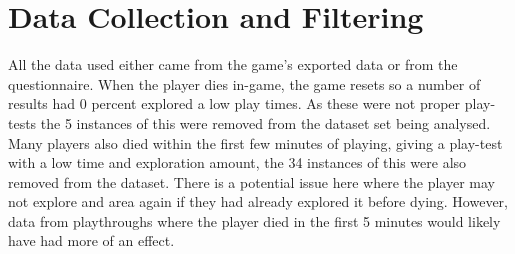 \documentclass[journal]{IEEEtran}
\begin{document}
	\section{Data Collection and Filtering}  \label{datacollection}
	All the data used either came from the game's exported data or from the questionnaire. When the player dies in-game, the game resets so a number of results had 0 percent explored a low play times. As these were not proper play-tests the 5 instances of this were removed from the dataset set being analysed.  Many players also died within the first few minutes of playing, giving a play-test with a low time and exploration amount, the 34 instances of this were also removed from the dataset.  There is a potential issue here where the player may not explore and area again if they had already explored it before dying. However, data from playthroughs where the player died in the first 5 minutes would likely have had more of an effect. 
	
\end{document}
